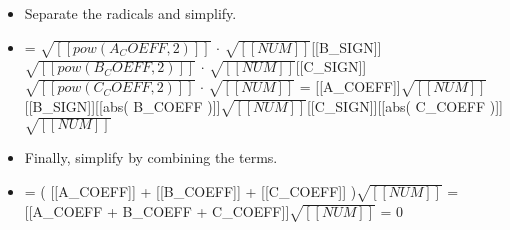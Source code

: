 \documentclass{article}
\begin{document}
\begin{itemize}
  \item Separate the radicals and simplify.
  \item = $\sqrt{[[pow( A_COEFF, 2 )]]}$ $\cdot$ $\sqrt{[[NUM]]}$[[B\_SIGN]]$\sqrt{[[pow( B_COEFF, 2 )]]}$ $\cdot$ $\sqrt{[[NUM]]}$[[C\_SIGN]]$\sqrt{[[pow( C_COEFF, 2 )]]}$ $\cdot$ $\sqrt{[[NUM]]}$
                    = [[A\_COEFF]]$\sqrt{[[NUM]]}$[[B\_SIGN]][[abs( B\_COEFF )]]$\sqrt{[[NUM]]}$[[C\_SIGN]][[abs( C\_COEFF )]]$\sqrt{[[NUM]]}$
  \item Finally, simplify by combining the terms.
  \item = ( [[A\_COEFF]] + [[B\_COEFF]] + [[C\_COEFF]] )$\sqrt{[[NUM]]}$ = [[A\_COEFF + B\_COEFF + C\_COEFF]]$\sqrt{[[NUM]]}$ = 0
\end{itemize}
\end{document}
